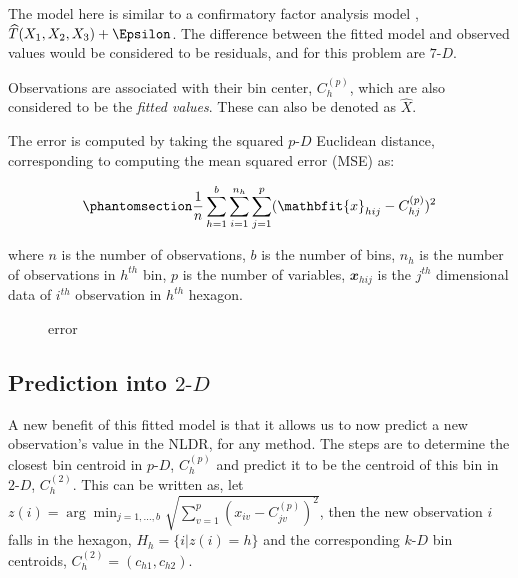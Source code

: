 \documentclass[
  12pt]{article}
\newcommand\pD{$p\text{-}D$}
\newcommand\kD{$k\text{-}D$}
\newcommand\gD{$2\text{-}D$}
\begin{document}
The model here is similar to a confirmatory factor analysis model
\citep{brown2015}, \(\widehat{T}(X_1, X_2, X_3) + \Epsilon\). The
difference between the fitted model and observed values would be
considered to be residuals, and for this problem are \(7\text{-}D\).

Observations are associated with their bin center, \(C_{h}^{(p)}\),
which are also considered to be the \emph{fitted values}. These can also
be denoted as \(\widehat{X}\).

The error is computed by taking the squared \pD{} Euclidean distance,
corresponding to computing the mean squared error (MSE) as:

\begin{equation}\phantomsection\label{eq-equation1}{\frac{1}{n}\sum_{h = 1}^{b}\sum_{i = 1}^{n_h}\sum_{j = 1}^{p} (\mathbfit{x}_{hij} - C^{(p)}_{hj})^2}\end{equation}

where \(n\) is the number of observations, \(b\) is the number of bins,
\(n_h\) is the number of observations in \(h^{th}\) bin, \(p\) is the
number of variables, \(\mathbfit{x}_{hij}\) is the \(j^{th}\)
dimensional data of \(i^{th}\) observation in \(h^{th}\) hexagon.

\begin{figure}[H]


\caption{\label{fig-p-d-error-in-2d-scurve}error}

\end{figure}%

\subsection{\texorpdfstring{Prediction into
\gD{}}{Prediction into }}\label{prediction-into}

A new benefit of this fitted model is that it allows us to now predict a
new observation's value in the NLDR, for any method. The steps are to
determine the closest bin centroid in \pD{}, \(C^{(p)}_{h}\) and predict
it to be the centroid of this bin in \gD{}, \(C^{(2)}_{h}\). This can be
written as, let
\(z(i) = \arg\min_{j = 1, \dots, b} \sqrt{\sum_{v=1}^{p}(x_{iv} - C^{(p)}_{jv})^2}\),
then the new observation \(i\) falls in the hexagon,
\(H_h = \{i| z(i) = h\}\) and the corresponding \kD{} bin centroids,
\(C_{h}^{(2)} = (c_{h1}, c_{h2})\).
\end{document}
